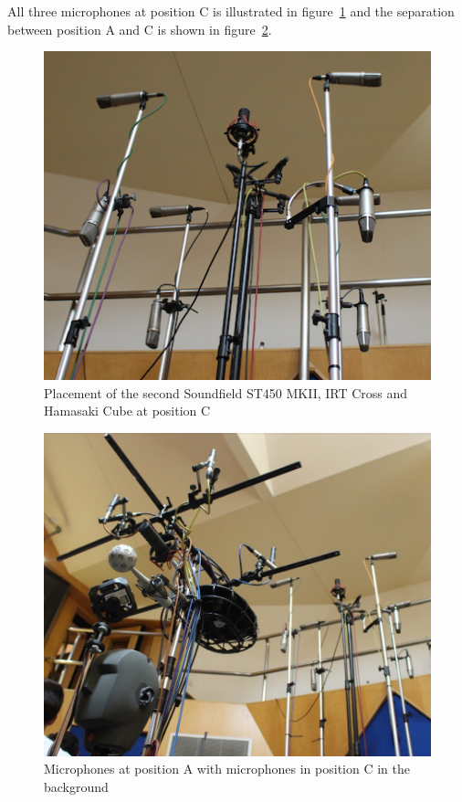 			All three microphones at position C is illustrated in figure~\ref{pos3} and the separation between position A and C is shown in figure~\ref{AvsC}.\\

			\begin{figure}[h]
			\begin{center}
				\includegraphics[width = \linewidth]{images/other/positionC.png}
				\caption{Placement of the second Soundfield ST450 MKII, IRT Cross and Hamasaki Cube at position C}
				\label{pos3}
			\end{center}
			\end{figure}

			\begin{figure}[h]
			\begin{center}
				\includegraphics[width =\linewidth]{images/other/posAC.png}
				\caption{Microphones at position A with microphones in position C in the background}
				\label{AvsC}
			\end{center}
			\end{figure}

